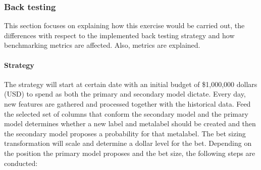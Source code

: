\subsubsection{Back testing}
\label{sec:methods_pipeline_backtesting}

This section focuses on explaining how this exercise would be 
carried out, the differences with respect to the implemented
back testing strategy and how benchmarking metrics are affected.
Also, metrics are explained.

\paragraph{Strategy} The strategy will start at certain date with an
initial budget of \$1,000,000 dollars (USD) to spend as both 
the primary and secondary model dictate. Every day, new features are gathered
and processed together with the historical data. Feed the selected set of
columns that conform the secondary model and the primary model determines
whether a new label and metalabel should be created and then the secondary model
proposes a probability for that metalabel. The bet sizing transformation will
scale and determine a dollar level for the bet. Depending on the position the
primary model proposes and the bet size, the following steps are conducted:

